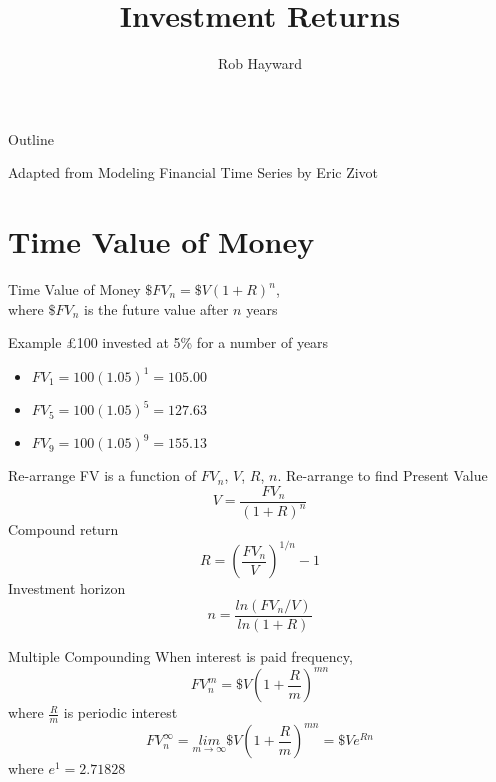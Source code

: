 \documentclass[14pt,xcolor=pdftex,dvipsnames,table]{beamer}
\title{Investment Returns}
\author{Rob Hayward}
\begin{document}
\begin{frame}
\titlepage
\end{frame}

\begin{frame}{Outline}
\tableofcontents
\end{frame}

\begin{frame}
Adapted from Modeling Financial Time Series by Eric Zivot
\end{frame}

\section{Time Value of Money}
\begin{frame}{Time Value of Money}
$\$FV_n = \$V(1+R)^n$, \\
\vskip1cm
where $\$FV_n$ is the future value after $n$ years 
\end{frame}

\begin{frame}{Example}
£100 invested at 5\% for a number of years
\begin{itemize}[<+-| alert@+>]
\item $FV_1 = 100(1.05)^1 = 105.00$
\item $FV_5 = 100(1.05)^5 = 127.63$
\item $FV_9 = 100(1.05)^9 = 155.13$
\end{itemize}
\end{frame}

\begin{frame}{Re-arrange}
FV is a function of $FV_n$, $V$, $R$, $n$.   Re-arrange to find
Present Value 
\begin{equation}
V=\frac{FV_n}{(1+R)^n}
\end{equation}
Compound return 
\begin{equation}
R=\left( \frac{FV_n}{V} \right)^{1/n} - 1
\end{equation}
Investment horizon  
\begin{equation}
n=\frac{ln(FV_n/V)}{ln(1+R)}
\end{equation}
\end{frame} 

\begin{frame}{Multiple Compounding}
When interest is paid frequency, 
\begin{equation}
FV^m_n = \$V \left( 1+\frac{R}{m}\right)^{mn}
\end{equation}
where $\frac{R}{m}$ is periodic interest
\begin{equation}
FV^{\infty}_n=\underset{m \rightarrow \infty}{lim}\$V \left(1+\frac{R}{m} \right)^{mn} = \$Ve^{Rn}
\end{equation}
where $e^1=2.71828$
\end{frame}
\end{document}
